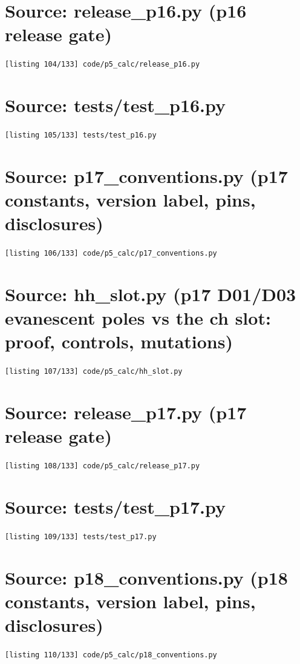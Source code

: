 \section{Source: release\_p16.py (p16 release gate)}
\noindent\texttt{[listing 104/133] code/p5\_calc/release\_p16.py}
{\scriptsize}

\section{Source: tests/test\_p16.py}
\noindent\texttt{[listing 105/133] tests/test\_p16.py}
{\scriptsize}

\section{Source: p17\_conventions.py (p17 constants, version label, pins, disclosures)}
\noindent\texttt{[listing 106/133] code/p5\_calc/p17\_conventions.py}
{\scriptsize}

\section{Source: hh\_slot.py (p17 D01/D03 evanescent poles vs the ch slot: proof, controls, mutations)}
\noindent\texttt{[listing 107/133] code/p5\_calc/hh\_slot.py}
{\scriptsize}

\section{Source: release\_p17.py (p17 release gate)}
\noindent\texttt{[listing 108/133] code/p5\_calc/release\_p17.py}
{\scriptsize}

\section{Source: tests/test\_p17.py}
\noindent\texttt{[listing 109/133] tests/test\_p17.py}
{\scriptsize}

\section{Source: p18\_conventions.py (p18 constants, version label, pins, disclosures)}
\noindent\texttt{[listing 110/133] code/p5\_calc/p18\_conventions.py}
{\scriptsize}

